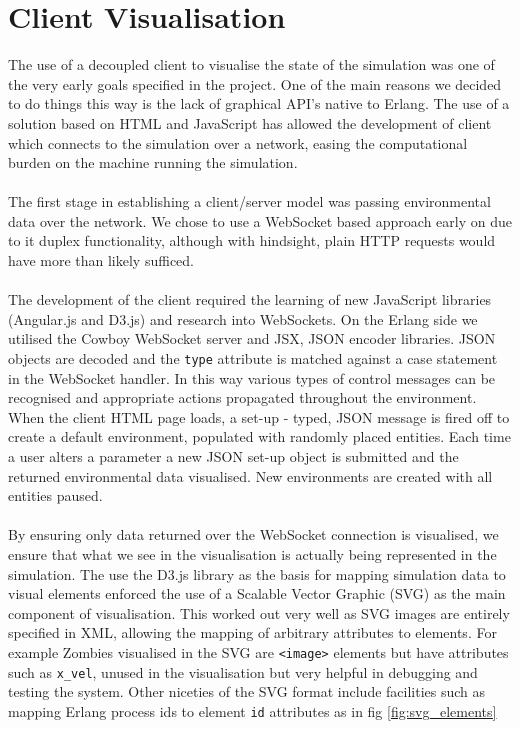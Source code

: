 \documentclass[10pt, a4paper, conference, compsocconf]{IEEEtran}
\begin{document}
\section{Client Visualisation \label{client}}
\label{visualisation}
The use of a decoupled client to visualise the state of the simulation was one of the very early goals specified in the project. One of the main reasons we decided to do things this way is the lack of graphical API's native to Erlang. The use of a solution based on HTML and JavaScript has allowed the development of client which connects to the simulation over a network, easing the computational burden on the machine running the simulation.\\
\\
The first stage in establishing a client/server model was passing environmental data over the network. We chose to use a WebSocket based approach early on due to it duplex functionality, although with hindsight, plain HTTP requests would have more than likely sufficed.\\
\\
The development of the client required the learning of new JavaScript libraries (Angular.js and D3.js) and research into WebSockets. On the Erlang side we utilised the Cowboy WebSocket\cite{cowboy} server and JSX, JSON encoder libraries. JSON objects are decoded and the \verb+type+ attribute is matched against a case statement in the WebSocket handler. In this way various types of control messages can be recognised and appropriate actions propagated throughout the environment. When the client HTML page loads, a set-up - typed, JSON message is fired off to create a default environment, populated with randomly placed entities. Each time a user alters a parameter a new JSON set-up object is submitted and the returned environmental data visualised. New environments are created with all entities paused.\\
\\
By ensuring only data returned over the WebSocket connection is visualised, we ensure that what we see in the visualisation is actually being represented in the simulation. The use the D3.js library as the basis for mapping simulation data to visual elements enforced the use of a Scalable Vector Graphic (SVG) as the main component of visualisation. This worked out very well as SVG images are entirely specified in XML, allowing the mapping of arbitrary attributes to elements. For example Zombies visualised in the SVG are \verb+<image>+ elements but have attributes such as \verb+x_vel+, unused in the visualisation but very helpful in debugging and testing the system. Other niceties of the SVG format include facilities such as mapping Erlang process ids to element \verb+id+ attributes as in fig \ref{fig:svg_elements}
\end{document}
